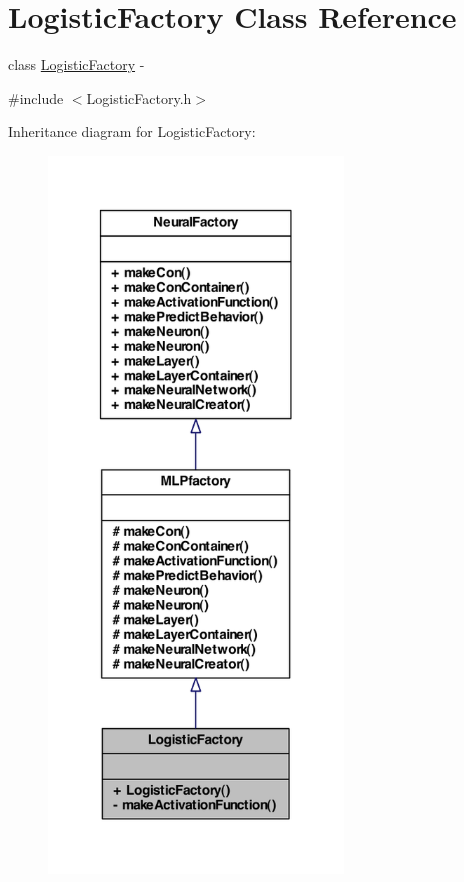 \hypertarget{class_logistic_factory}{
\section{LogisticFactory Class Reference}
\label{class_logistic_factory}
}


class \hyperlink{class_logistic_factory}{LogisticFactory} -\/  




{\ttfamily \#include $<$LogisticFactory.h$>$}



Inheritance diagram for LogisticFactory:
\nopagebreak
\begin{figure}[H]
\begin{center}
\leavevmode
\includegraphics[width=222pt]{class_logistic_factory__inherit__graph}
\end{center}
\end{figure}


